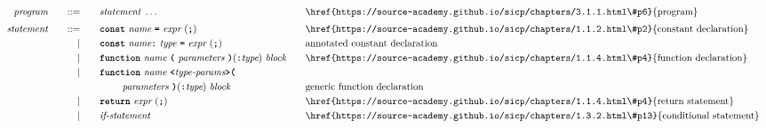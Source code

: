 \begin{alignat*}{9}
&& \textit{program}    &&\quad ::= &\quad && \textit{statement} \ \ldots
                                                           && \textrm{\href{https://source-academy.github.io/sicp/chapters/3.1.1.html\#p6}{program}} \\[1mm]
&& \textit{statement}    &&\quad ::= &\quad && \textbf{\texttt{const}}\  \textit{name} \ 
                                           \textbf{\texttt{=}}\  \textit{expr} \ (\textbf{\texttt{;}})
                                                           && \textrm{\href{https://source-academy.github.io/sicp/chapters/1.1.2.html\#p2}{constant declaration}} \\
&&                       && |   &\quad && \textbf{\texttt{const}}\  \textit{name} \code{:}\ \textit{type} \ 
                                           \textbf{\texttt{=}}\  \textit{expr} \ (\textbf{\texttt{;}})
                                                           && \textrm{annotated constant declaration} \\
&&                       && |   &\quad && \textbf{\texttt{function}}\  \textit{name} \ 
                                   \textbf{\texttt{(}}\  \textit{parameters} \ \textbf{\texttt{)}} (\code{:} \textit{type})\ \textit{block} \quad
                                                           && \textrm{\href{https://source-academy.github.io/sicp/chapters/1.1.4.html\#p4}{function declaration}}\\
&&                       && |   &\quad && \textbf{\texttt{function}}\ \textit{name} \ \code{<} \textit{type-params} \code{>(}
                                                           && \\
&&                       &&     &\quad && \quad\quad\  \textit{parameters} \ \textbf{\texttt{)}} (\code{:} \textit{type})\ \textit{block} \quad
                                                           && \textrm{generic function declaration }\\
&&                       && |   &\quad && \textbf{\texttt{return}}\  \textit{expr} \ (\textbf{\texttt{;}})
                                                           && \textrm{\href{https://source-academy.github.io/sicp/chapters/1.1.4.html\#p4}{return statement}}\\
&&                       && |   &\quad && \textit{if-statement} \quad
                                                           && \textrm{\href{https://source-academy.github.io/sicp/chapters/1.3.2.html\#p13}{conditional statement}}\\

\end{alignat*}
